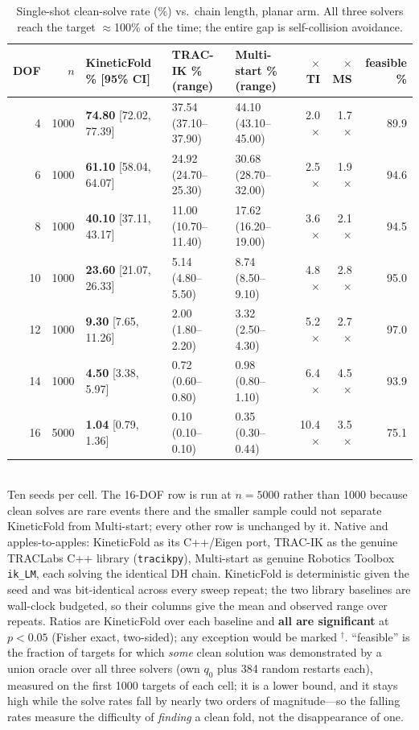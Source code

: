 \documentclass[10pt,conference]{IEEEtran}
\begin{document}
\begin{table}[t]
\centering
\caption{Single-shot clean-solve rate (\%) vs.\ chain length, planar arm.
All three solvers reach the target $\approx$100\% of the time; the entire gap
is self-collision avoidance.}
\label{tab:dof_scaling}
\begin{tabular}{r r l l l r r r}
\toprule
DOF & $n$ & KineticFold \% [95\% CI] & TRAC-IK \% (range) & Multi-start \% (range) & $\times$TI & $\times$MS & feasible \% \\
\midrule
4 & 1000 & \textbf{74.80} [72.02, 77.39] & 37.54 (37.10--37.90) & 44.10 (43.10--45.00) & 2.0$\times$ & 1.7$\times$ & 89.9 \\
6 & 1000 & \textbf{61.10} [58.04, 64.07] & 24.92 (24.70--25.30) & 30.68 (28.70--32.00) & 2.5$\times$ & 1.9$\times$ & 94.6 \\
8 & 1000 & \textbf{40.10} [37.11, 43.17] & 11.00 (10.70--11.40) & 17.62 (16.20--19.00) & 3.6$\times$ & 2.1$\times$ & 94.5 \\
10 & 1000 & \textbf{23.60} [21.07, 26.33] & 5.14 (4.80--5.50) & 8.74 (8.50--9.10) & 4.8$\times$ & 2.8$\times$ & 95.0 \\
12 & 1000 & \textbf{9.30} [7.65, 11.26] & 2.00 (1.80--2.20) & 3.32 (2.50--4.30) & 5.2$\times$ & 2.7$\times$ & 97.0 \\
14 & 1000 & \textbf{4.50} [3.38, 5.97] & 0.72 (0.60--0.80) & 0.98 (0.80--1.10) & 6.4$\times$ & 4.5$\times$ & 93.9 \\
16 & 5000 & \textbf{1.04} [0.79, 1.36] & 0.10 (0.10--0.10) & 0.35 (0.30--0.44) & 10.4$\times$ & 3.5$\times$ & 75.1 \\
\bottomrule
\end{tabular}\\[2pt]
{\footnotesize Ten seeds per cell. The 16-DOF row is run at $n=5000$ rather than
1000 because clean solves are rare events there and the smaller sample could not
separate KineticFold from Multi-start; every other row is unchanged by it.
Native and apples-to-apples: KineticFold as its C++/Eigen port, TRAC-IK as the
genuine TRACLabs C++ library (\texttt{tracikpy}), Multi-start as genuine Robotics
Toolbox \texttt{ik\_LM}, each solving the identical DH chain. KineticFold is
deterministic given the seed and was bit-identical across every sweep repeat;
the two library baselines are wall-clock budgeted, so their columns give the mean
and observed range over repeats. Ratios are KineticFold over each baseline and
\textbf{all are significant} at $p<0.05$ (Fisher exact, two-sided); any exception
would be marked $^{\dagger}$. ``feasible'' is the fraction of targets for which
\emph{some} clean solution was demonstrated by a union oracle over all three
solvers (own $q_0$ plus 384 random restarts each), measured on the first 1000
targets of each cell; it is a lower bound, and it stays high while the
solve rates fall by nearly two orders of magnitude---so the falling rates measure
the difficulty of \emph{finding} a clean fold, not the disappearance of one.}
\end{table}
\end{document}
